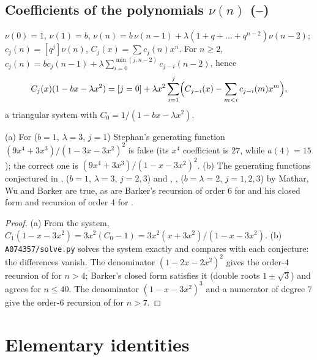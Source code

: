 \subsection{Coefficients of the polynomials \texorpdfstring{$\nu(n)$}{nu(n)} (--)}\label{s:A074355}
$\nu(0)=1$, $\nu(1)=b$, $\nu(n)=b\,\nu(n-1)+\lambda(1+q+\dots+q^{n-2})\nu(n-2)$; $c_j(n)=[q^j]\nu(n)$, $C_j(x)=\sum c_j(n)x^n$.
For $n\ge2$, $c_j(n)=bc_j(n-1)+\lambda\sum_{i=0}^{\min(j,n-2)}c_{j-i}(n-2)$, hence
\[ C_j(x)(1-bx-\lambda x^2)=[j=0]+\lambda x^2\sum_{i=1}^j\Bigl(C_{j-i}(x)-\sum_{m<i}c_{j-i}(m)x^m\Bigr), \]
a triangular system with $C_0=1/(1-bx-\lambda x^2)$.
\begin{theorem} (a) For  ($b=1$, $\lambda=3$, $j=1$) Stephan's generating function
$(9x^4+3x^3)/(1-3x-3x^2)^2$ is false (its $x^4$ coefficient is $27$, while $a(4)=15$); the correct one is
$(9x^4+3x^3)/(1-x-3x^2)^2$. (b) The generating functions conjectured in ,  ($b=1$,
$\lambda=3$, $j=2,3$) and , ,  ($b=\lambda=2$, $j=1,2,3$) by Mathar, Wu
and Barker are true, as are Barker's recursion of order $6$ for  and his closed form and recursion of
order $4$ for .\end{theorem}
\begin{proof} (a) From the system, $C_1(1-x-3x^2)=3x^2(C_0-1)=3x^2(x+3x^2)/(1-x-3x^2)$. (b) \texttt{A074357/solve.py}
solves the system exactly and compares with each conjecture: the differences vanish. The denominator
$(1-2x-2x^2)^2$ gives the order-$4$ recursion of  for $n>4$; Barker's closed form satisfies it (double
roots $1\pm\sqrt3$) and agrees for $n\le40$. The denominator $(1-x-3x^2)^3$ and a numerator of degree $7$ give the
order-$6$ recursion of  for $n>7$. \end{proof}

\section{Elementary identities}\label{s:elem}
